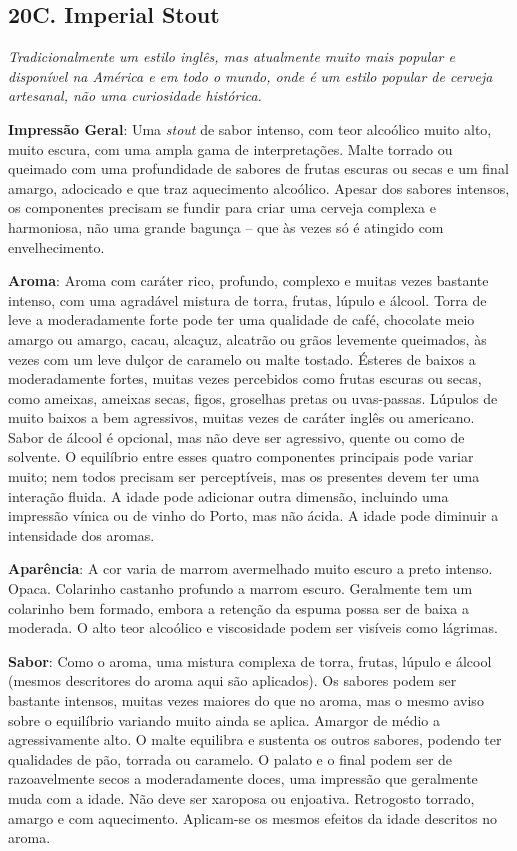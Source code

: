 \subsection*{20C. Imperial Stout}
\textit{Tradicionalmente um estilo inglês, mas atualmente muito mais popular e disponível na América e em todo o mundo, onde é um estilo popular de cerveja artesanal, não uma curiosidade histórica.}

\textbf{Impressão Geral}: Uma \textit{stout} de sabor intenso, com teor alcoólico muito alto, muito escura, com uma ampla gama de interpretações. Malte torrado ou queimado com uma profundidade de sabores de frutas escuras ou secas e um final amargo, adocicado e que traz aquecimento alcoólico. Apesar dos sabores intensos, os componentes precisam se fundir para criar uma cerveja complexa e harmoniosa, não uma grande bagunça – que às vezes só é atingido com envelhecimento.

\textbf{Aroma}: Aroma com caráter rico, profundo, complexo e muitas vezes bastante intenso, com uma agradável mistura de torra, frutas, lúpulo e álcool. Torra de leve a moderadamente forte pode ter uma qualidade de café, chocolate meio amargo ou amargo, cacau, alcaçuz, alcatrão ou grãos levemente queimados, às vezes com um leve dulçor de caramelo ou malte tostado. Ésteres de baixos a moderadamente fortes, muitas vezes percebidos como frutas escuras ou secas, como ameixas, ameixas secas, figos, groselhas pretas ou uvas-passas. Lúpulos de muito baixos a bem agressivos, muitas vezes de caráter inglês ou americano. Sabor de álcool é opcional, mas não deve ser agressivo, quente ou como de solvente. O equilíbrio entre esses quatro componentes principais pode variar muito; nem todos precisam ser perceptíveis, mas os presentes devem ter uma interação fluida. A idade pode adicionar outra dimensão, incluindo uma impressão vínica ou de vinho do Porto, mas não ácida. A idade pode diminuir a intensidade dos aromas.

\textbf{Aparência}: A cor varia de marrom avermelhado muito escuro a preto intenso. Opaca. Colarinho castanho profundo a marrom escuro. Geralmente tem um colarinho bem formado, embora a retenção da espuma possa ser de baixa a moderada. O alto teor alcoólico e viscosidade podem ser visíveis como lágrimas.

\textbf{Sabor}: Como o aroma, uma mistura complexa de torra, frutas, lúpulo e álcool (mesmos descritores do aroma aqui são aplicados). Os sabores podem ser bastante intensos, muitas vezes maiores do que no aroma, mas o mesmo aviso sobre o equilíbrio variando muito ainda se aplica. Amargor de médio a agressivamente alto. O malte equilibra e sustenta os outros sabores, podendo ter qualidades de pão, torrada ou caramelo. O palato e o final podem ser de razoavelmente secos a moderadamente doces, uma impressão que geralmente muda com a idade. Não deve ser xaroposa ou enjoativa. Retrogosto torrado, amargo e com aquecimento. Aplicam-se os mesmos efeitos da idade descritos no aroma.

